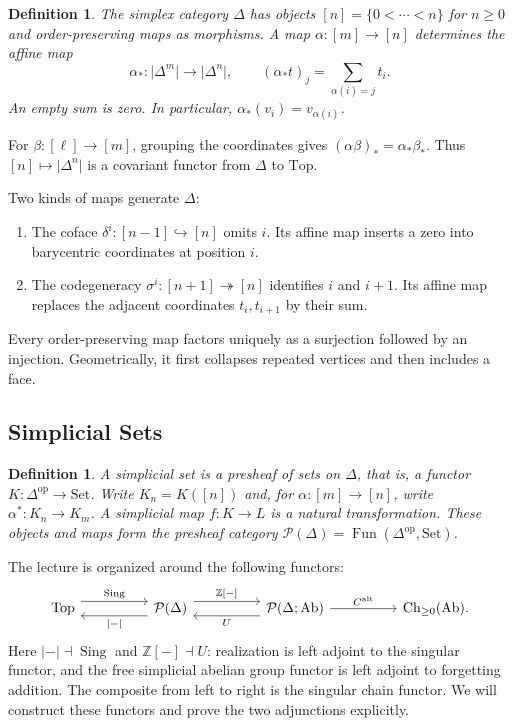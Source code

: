 \documentclass[11pt]{article}
\theoremstyle{linked}
\theoremstyle{plainlecture}
\newtheorem{definition}[proposition]{Definition}
\newcommand{\Z}{\mathbb Z}
\newcommand{\PSh}{\mathcal{P}}
\newcommand{\Fun}{\operatorname{Fun}}
\newcommand{\Ch}{\mathrm{Ch}}
\newcommand{\Sing}{\operatorname{Sing}}
\newcommand{\Top}{\mathrm{Top}}
\newcommand{\Set}{\mathrm{Set}}
\newcommand{\Ab}{\mathrm{Ab}}
\newcommand{\C}{C^{\mathrm{alt}}}
\begin{document}
\begin{definition}
The simplex category $\Delta$ has objects $[n]=\{0<\cdots<n\}$ for $n\geq0$ and order-preserving maps as morphisms. A map $\alpha:[m]\to[n]$ determines the affine map
\[
\alpha_*:\lvert\Delta^{m}\rvert\longrightarrow\lvert\Delta^{n}\rvert,
\qquad (\alpha_*t)_j=\sum_{\alpha(i)=j}t_i.
\]
An empty sum is zero. In particular, $\alpha_*(v_i)=v_{\alpha(i)}$.
\end{definition}
For $\beta:[\ell]\to[m]$, grouping the coordinates gives
$(\alpha\beta)_*=\alpha_*\beta_*$. Thus $[n]\mapsto\lvert\Delta^{n}\rvert$ is a covariant functor from $\Delta$ to $\Top$.

Two kinds of maps generate $\Delta$:
\begin{enumerate}
\item The coface $\delta^i:[n-1]\hookrightarrow[n]$ omits $i$. Its affine map inserts a zero into barycentric coordinates at position $i$.
\item The codegeneracy $\sigma^i:[n+1]\twoheadrightarrow[n]$ identifies $i$ and $i+1$. Its affine map replaces the adjacent coordinates $t_i,t_{i+1}$ by their sum.
\end{enumerate}
Every order-preserving map factors uniquely as a surjection followed by an injection. Geometrically, it first collapses repeated vertices and then includes a face.

\subsection{Simplicial Sets}
\begin{definition}
A simplicial set is a presheaf of sets on $\Delta$, that is, a functor $K:\Delta^{\mathrm{op}}\to\Set$. Write $K_n=K([n])$ and, for $\alpha:[m]\to[n]$, write $\alpha^*:K_n\to K_m$. A simplicial map $f:K\to L$ is a natural transformation. These objects and maps form the presheaf category $\PSh(\Delta)=\Fun(\Delta^{\mathrm{op}},\Set)$.
\end{definition}
The lecture is organized around the following functors:
\[
\begin{tikzcd}[column sep=huge]
\Top \arrow[r,shift left=1.2ex,"\Sing"] &
\PSh(\Delta) \arrow[l,shift left=1.2ex,"{|{-}|}"]
\arrow[r,shift left=1.2ex,"{\Z[-]}"] &
\PSh(\Delta;\Ab) \arrow[l,shift left=1.2ex,"U"]
\arrow[r,"\C"] & \Ch_{\geq0}(\Ab).
\end{tikzcd}
\]
Here $|{-}|\dashv\Sing$ and $\Z[-]\dashv U$: realization is left adjoint to the singular functor, and the free simplicial abelian group functor is left adjoint to forgetting addition. The composite from left to right is the singular chain functor. We will construct these functors and prove the two adjunctions explicitly.
\end{document}
